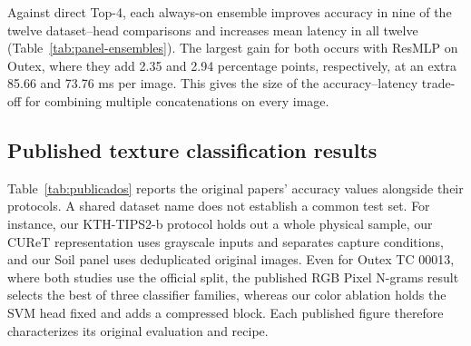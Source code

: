 \documentclass[10pt,a4paper,fleqn]{article}
\begin{document}
Against direct Top-4, each always-on ensemble improves accuracy in nine of the twelve dataset--head comparisons and increases mean latency in all twelve (Table~\ref{tab:panel-ensembles}). The largest gain for both occurs with ResMLP on Outex, where they add 2.35 and 2.94 percentage points, respectively, at an extra 85.66 and 73.76 ms per image. This gives the size of the accuracy--latency trade-off for combining multiple concatenations on every image.

\FloatBarrier
\subsection{Published texture classification results}

Table~\ref{tab:publicados} reports the original papers' accuracy values alongside their protocols. A shared dataset name does not establish a common test set. For instance, our KTH-TIPS2-b protocol holds out a whole physical sample, our CUReT representation uses grayscale inputs and separates capture conditions, and our Soil panel uses deduplicated original images. Even for Outex TC 00013, where both studies use the official split, the published RGB Pixel N-grams result selects the best of three classifier families, whereas our color ablation holds the SVM head fixed and adds a compressed block. Each published figure therefore characterizes its original evaluation and recipe.
\end{document}
